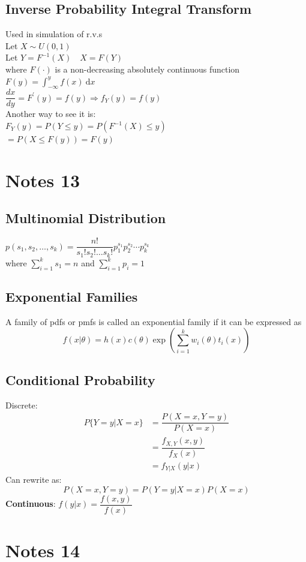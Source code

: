 \documentclass[openany]{book}
\newcommand{\dx}{\mathrm{d}x}
\begin{document}
\begin{flushleft}
\section{Inverse Probability Integral Transform}
Used in simulation of r.v.s\\
Let $X\sim U(0,1)$\\
Let $Y=F^{-1}(X) \quad X=F(Y)$\\
where $F(\cdot)$ is a non-decreasing absolutely continuous function\\
$F(y)=\int_{-\infty}^{y}f(x) \ \dx$\\
$\dfrac{dx}{dy}=F^{'}(y)=f(y)\Rightarrow f_Y(y)=f(y)$\\
Another way to see it is:\\
$F_Y(y)=P(Y\leq y)=P(F^{-1}(X)\leq y)$\\
$=P(X\leq F(y))=F(y)$\\
\chapter{Notes 13}
\section{Multinomial Distribution}
$p(s_1,s_2,\dots,s_k)=\dfrac{n!}{s_1!s_2!\dots s_k!}p_1^{s_1}p_2^{s_2}\cdots p_k^{s_k}$\\
where $\sum_{i=1}^{k}s_1=n$ and $\sum_{i=1}^{k}p_i=1$
\section{Exponential Families}
A family of pdfs or pmfs is called an exponential family if it can be expressed as
\[f(x|\theta)=h(x)c(\theta)\exp\left(\sum_{i=1}^{k}w_i(\theta)t_i(x)\right)
\]
\section{Conditional Probability}
Discrete:\\
\begin{align*}
P\{Y=y|X=x \}&=\dfrac{P(X=x,Y=y)}{P(X=x)}\\
&=\dfrac{f_{X,Y}(x,y)}{f_X(x)}\\
&=f_{Y|X}(y|x)
\end{align*}
Can rewrite as:\\
\[P(X=x,Y=y)=P(Y=y|X=x)P(X=x)
\]
\textbf{Continuous}: $f(y|x)=\dfrac{f(x,y)}{f(x)}$

\chapter{Notes 14}

\end{flushleft}
\end{document}

